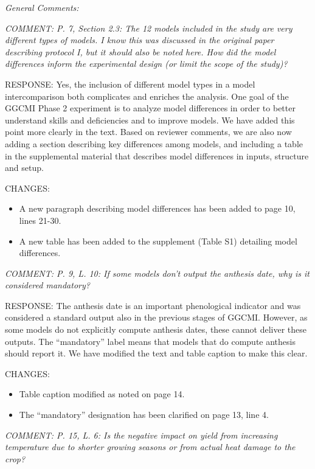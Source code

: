 \documentclass[gmd, manuscript]{copernicus} %
\begin{document}
\smallskip

\textcolor{dark-gray}{\textit{General Comments:}}

\textcolor{dark-gray}{\textit{COMMENT: P. 7, Section 2.3: The 12 models included in the study are very different types of models. I know this was discussed in the original paper describing protocol I, but it should also be noted here. How did the model differences inform the experimental design (or limit the scope of the study)?}}

RESPONSE: Yes, the inclusion of different model types in a model intercomparison both complicates and enriches the analysis. One goal of the GGCMI Phase 2 experiment is to analyze model differences in order to better understand skills and deficiencies and to improve models. We have added this point more clearly in the text. Based on reviewer comments, we are also now adding a section describing key differences among models, and including a table in the supplemental material that describes model differences in inputs, structure and setup.
\smallskip

CHANGES:
\begin{itemize}
    \item A new paragraph describing model differences has been added to page 10, lines 21-30.
    \item A new table has been added to the supplement (Table S1) detailing model differences.
\end{itemize}

\smallskip
\textcolor{dark-gray}{\textit{COMMENT: P. 9, L. 10: If some models don’t output the anthesis date, why is it considered mandatory?}}

RESPONSE: The anthesis date is an important phenological indicator and was considered a standard output also in the previous stages of GGCMI. However, as some models do not explicitly compute anthesis dates, these cannot deliver these outputs. The “mandatory” label means that models that do compute anthesis should report it. We have modified the text and table caption to make this clear.
\smallskip

CHANGES:
\begin{itemize}
    \item Table caption modified as noted on page 14.
    \item The ``mandatory'' designation has been clarified on page 13, line 4. 
\end{itemize}

\smallskip

\textcolor{dark-gray}{\textit{COMMENT: P. 15, L. 6: Is the negative impact on yield from increasing temperature due to shorter growing seasons or from actual heat damage to the crop?}}
\end{document}
